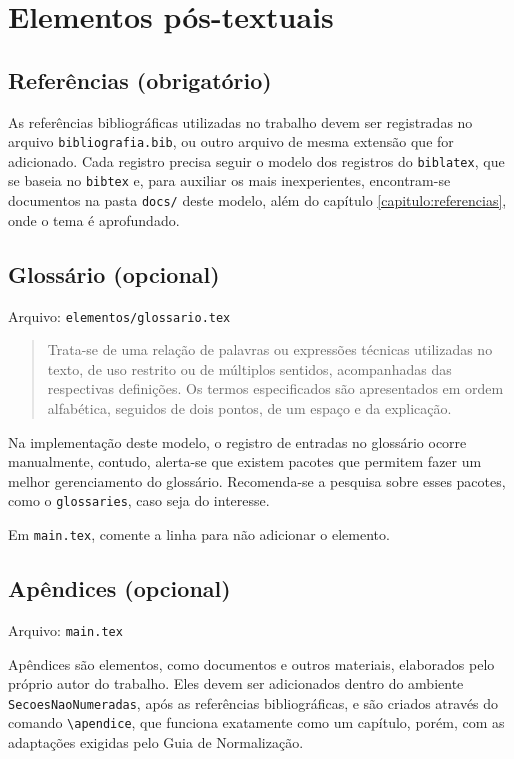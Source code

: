 \section{Elementos pós-textuais}

\subsection{Referências (obrigatório)}
    As referências bibliográficas utilizadas no trabalho devem ser registradas no arquivo \texttt{bibliografia.bib}, ou outro arquivo de mesma extensão que for adicionado. Cada registro precisa seguir o modelo dos registros do \texttt{biblatex}, que se baseia no \texttt{bibtex} e, para auxiliar os mais inexperientes, encontram-se documentos na pasta \texttt{docs/} deste modelo, além do capítulo \ref{capitulo:referencias}, onde o tema é aprofundado.

\subsection{Glossário (opcional)}
    Arquivo: \texttt{elementos/glossario.tex}
    
    \blockcquote[p. 33]{livro:iffar-guia-normalizacao-2022}{Trata-se de uma relação de palavras ou expressões técnicas utilizadas no texto, de uso restrito ou de múltiplos sentidos, acompanhadas das respectivas definições. Os termos especificados são apresentados em ordem alfabética, seguidos de dois pontos, de um espaço e da
    explicação.}

    Na implementação deste modelo, o registro de entradas no glossário ocorre manualmente, contudo, alerta-se que existem pacotes que permitem fazer um melhor gerenciamento do glossário. Recomenda-se a pesquisa sobre esses pacotes, como o \texttt{glossaries}, caso seja do interesse.

    Em \texttt{main.tex}, comente a linha \verb|| para não adicionar o elemento.

\subsection{Apêndices (opcional)}
    Arquivo: \texttt{main.tex}
    
    Apêndices são elementos, como documentos e outros materiais, elaborados pelo próprio autor do trabalho. Eles devem ser adicionados dentro do ambiente \texttt{SecoesNaoNumeradas}, após as referências bibliográficas, e são criados através do comando \verb|\apendice|, que funciona exatamente como um capítulo, porém, com as adaptações exigidas pelo Guia de Normalização.

